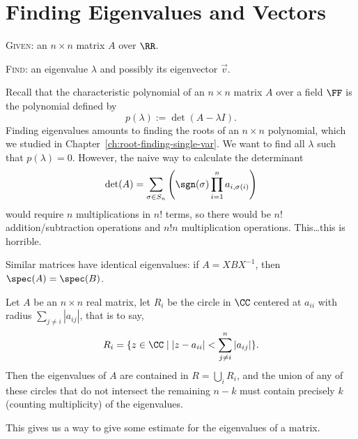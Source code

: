\chapter{Finding Eigenvalues and Vectors}

\begin{problem}
  \textsc{Given:}\enspace\ignorespaces%
an $n\times n$ matrix $A$ over $\RR$.

\textsc{Find:}\enspace\ignorespaces%
an eigenvalue $\lambda$ and possibly its eigenvector $\vec{v}$.
\end{problem}

Recall that the characteristic polynomial of an $n\times n$ matrix $A$
over a field $\FF$ is the polynomial defined by
\begin{equation}
p(\lambda):=\det(A-\lambda I).
\end{equation}
Finding eigenvalues amounts to finding the roots of an $n\times n$
polynomial, which we studied in Chapter~\ref{ch:root-finding-single-var}.
We want to find all $\lambda$ such that $p(\lambda)=0$. However, the
naive way to calculate the determinant
\begin{equation}
\det(A) = \sum_{\sigma\in S_{n}}\left(\sgn(\sigma)\prod^{n}_{i=1}a_{i,\sigma(i)}\right)
\end{equation}
would require $n$ multiplications in $n!$ terms, so there would be $n!$
addition/subtraction operations and $n!n$ multiplication
operations. This\dots this is horrible.

\begin{fact}
Similar matrices have identical eigenvalues: if $A=XBX^{-1}$, then
$\spec(A)=\spec(B)$. 
\end{fact}

\begin{theorem}
Let $A$ be an $n\times n$ real matrix, let $R_{i}$ be the circle in
$\CC$ centered at $a_{ii}$ with radius $\sum_{j\neq i}|a_{ij}|$, that is
to say,
\begin{equation*}
R_{i} = \{z\in\CC\mid |z-a_{ii}|<\sum^{n}_{j\neq i}|a_{ij}|\}.
\end{equation*}
Then the eigenvalues of $A$ are contained in $R=\bigcup_{i}R_{i}$, and
the union of any of these circles that do not intersect the remaining
$n-k$ must contain precisely $k$ (counting multiplicity) of the eigenvalues.
\end{theorem}

This gives us a way to give some estimate for the eigenvalues of a
matrix.


